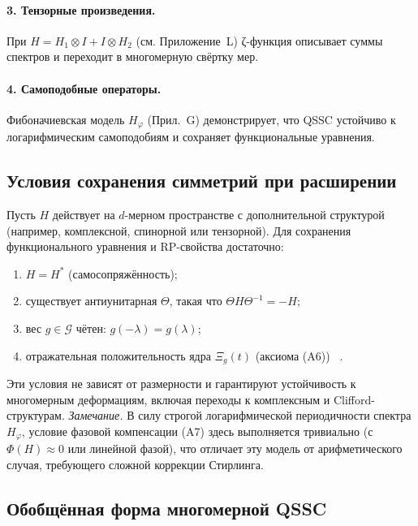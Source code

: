 \documentclass{article}
\numberwithin{equation}{section}
\theoremstyle{plain}
\theoremstyle{definition}
\theoremstyle{remark}
\begin{document}
\paragraph{3. Тензорные произведения.}
При \(H=H_1\otimes I + I\otimes H_2\) (см. Приложение~L) ζ-функция описывает  
суммы спектров и переходит в многомерную свёртку мер.

\paragraph{4. Самоподобные операторы.}
Фибоначиевская модель \(H_\varphi\) (Прил.~G) демонстрирует,
что QSSC устойчиво к логарифмическим самоподобиям и сохраняет функциональные уравнения.

\subsection*{Условия сохранения симметрий при расширении}

Пусть \(H\) действует на \(d\)-мерном пространстве с дополнительной структурой (например, комплексной, спинорной или тензорной).  
Для сохранения функционального уравнения и RP-свойства достаточно:

\begin{enumerate}
\item \(H=H^\ast\) (самосопряжённость);
\item существует антиунитарная \(\Theta\), такая что \(\Theta H \Theta^{-1}=-H\);
\item вес \(g\in\mathcal G\) чётен: \(g(-\lambda)=g(\lambda)\);
\item отражательная положительность ядра \(\Xi_g(t)\) (аксиома (A6)) ~\cite{OsterwalderSchrader1973, Jaffe2007}.
\end{enumerate}

Эти условия не зависят от размерности и гарантируют устойчивость к многомерным деформациям,  
включая переходы к комплексным и Clifford-структурам.
\emph{Замечание.} В силу строгой логарифмической периодичности спектра $H_\varphi$, условие фазовой компенсации (A7) здесь выполняется тривиально (с $\Phi(H) \approx 0$ или линейной фазой), что отличает эту модель от арифметического случая, требующего сложной коррекции Стирлинга.

\subsection*{Обобщённая форма многомерной QSSC}
\end{document}
